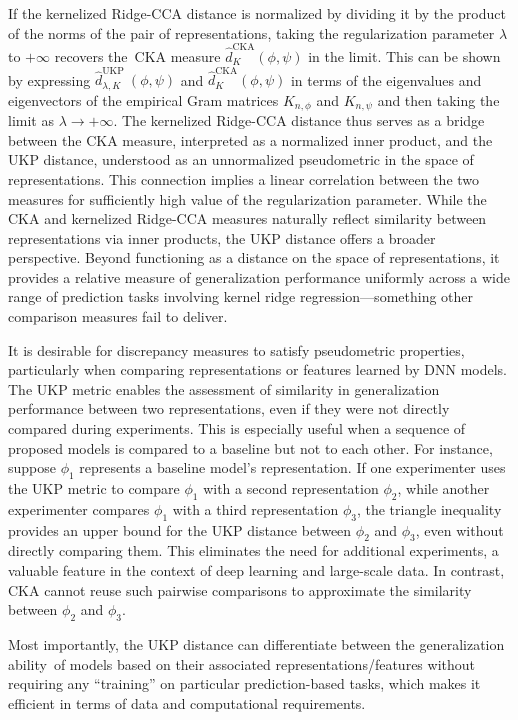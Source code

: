 \documentclass{article}
\theoremstyle{plain}
\newcommand{\repone}{\phi}
\newcommand{\reptwo}{\psi}
\newcommand{\metricstname}{UKP }
\begin{document}
If the kernelized Ridge-CCA distance is normalized by dividing it by the product of the norms of the pair of representations, taking the regularization parameter $\lambda$ to $+\infty$ recovers the CKA measure $\hat{d}_{K}^{\text{CKA}}(\repone,\reptwo)$ in the limit. This can be shown by expressing $\hat{d}_{\lambda,K}^{\text{\metricstname}}(\repone,\reptwo)$ and $\hat{d}_{K}^{\text{CKA}}(\repone,\reptwo)$ in terms of the eigenvalues and eigenvectors of the empirical Gram matrices $K_{n,\repone}$ and $K_{n,\reptwo}$ and then taking the limit as $\lambda \to +\infty$. The kernelized Ridge-CCA distance thus serves as a bridge between the CKA measure, interpreted as a normalized inner product, and the \metricstname distance, understood as an unnormalized pseudometric in the space of representations. This connection implies a linear correlation between the two measures for sufficiently high value of the regularization parameter. While the CKA and kernelized Ridge-CCA measures naturally reflect similarity between representations via inner products, the \metricstname distance offers a broader perspective. Beyond functioning as a distance on the space of representations, it provides a relative measure of generalization performance uniformly across a wide range of prediction tasks involving kernel ridge regression—something other comparison measures fail to deliver.

It is desirable for discrepancy measures to satisfy pseudometric properties, particularly when comparing representations or features learned by DNN models. The UKP metric enables the assessment of similarity in generalization performance between two representations, even if they were not directly compared during experiments. This is especially useful when a sequence of proposed models is compared to a baseline but not to each other. For instance, suppose $\phi_{1}$ represents a baseline model's representation. If one experimenter uses the UKP metric to compare $\phi_{1}$ with a second representation $\phi_{2}$, while another experimenter compares 
$\phi_{1}$ with a third representation $\phi_{3}$, the triangle inequality provides an upper bound for the UKP distance between $\phi_{2}$ and $\phi_{3}$, even without directly comparing them. This eliminates the need for additional experiments, a valuable feature in the context of deep learning and large-scale data. In contrast, CKA cannot reuse such pairwise comparisons to approximate the similarity between $\phi_{2}$ and $\phi_{3}$. 

Most importantly, the \metricstname distance can differentiate between the generalization ability of models based on their associated representations/features without requiring any ``training'' on particular prediction-based tasks, which makes it efficient in terms of data and computational requirements.
\end{document}
